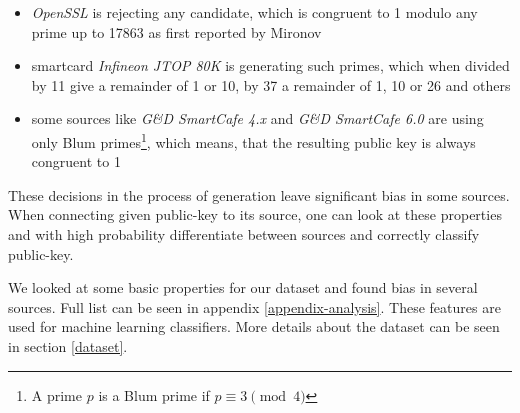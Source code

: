 \begin{itemize}

\item \textit{OpenSSL} is rejecting any candidate, which is congruent to 1 modulo any prime up to 17863 as first reported by Mironov\cite{mironov}

\item smartcard \textit{Infineon JTOP 80K} is generating such primes, which when divided by 11 give a remainder of 1 or 10, by 37 a remainder of 1, 10 or 26 and others

\item some sources like \textit{G\&D SmartCafe 4.x} and \textit{G\&D SmartCafe 6.0} are using only Blum primes\footnote{A prime $p$ is a Blum prime if $p \equiv 3 \pmod{4}$}, which means, that the resulting public key is always congruent to 1

\end{itemize}

These decisions in the process of generation leave significant bias in some sources. When connecting given public-key to its source, one can look at these properties and with high probability differentiate between sources and correctly classify public-key.

We looked at some basic properties for our dataset and found bias in several sources. Full list can be seen in appendix \ref{appendix-analysis}. These features are used for machine learning classifiers. More details about the dataset can be seen in section \ref{dataset}.

